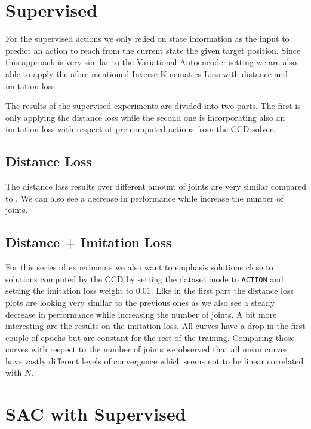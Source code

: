 \section{Supervised}

For the supervised actions we only relied on state information as the input to predict an action to reach from the current state the given target position.  Since this approach is very similar to the Variational Autoencoder setting we are also able to apply the afore mentioned Inverse Kinematics Loss with distance and imitation loss.

The results of the supervised experiments are divided into two parts. The first is only applying the distance loss while the second one is incorporating also an imitation loss with respect ot pre computed actions from the CCD solver.

\subsection{Distance Loss}

The distance loss results over different amount of joints are very similar compared to \figref{} . We can also see a decrease in performance while increase the number of joints. 

\subsection{Distance + Imitation Loss}

For this series of experiments we also want to emphasis solutions close to solutions computed by the CCD by setting the dataset mode to \texttt{ACTION} and setting the imitation loss weight to 0.01. Like in the first part the distance loss plots are looking very similar to the previous ones as we also see a steady decrease in performance while increasing the number of joints. 
A bit more interesting are the results on the imitation loss. All curves have a drop in the first couple of epochs but are constant for the rest of the training. Comparing those curves with respect to the number of joints we observed that all mean curves have vastly different levels of convergence which seems not to be linear correlated with $N$. 

\section{SAC with Supervised}